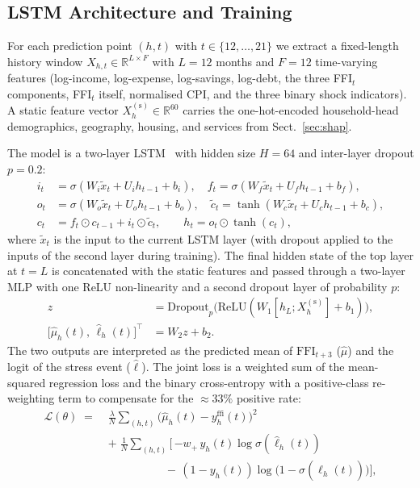 \documentclass[colorlinks,balance]{asmeconf}
\begin{document}
\subsection{LSTM Architecture and Training}\label{sec:ew:lstm}
For each prediction point $(h, t)$ with $t \!\in\! \{12, \ldots, 21\}$ we extract a fixed-length history window $X_{h,t} \!\in\! \mathbb{R}^{L \times F}$ with $L \!=\! 12$ months and $F \!=\! 12$ time-varying features (log-income, log-expense, log-savings, log-debt, the three FFI$_t$ components, FFI$_t$ itself, normalised CPI, and the three binary shock indicators). A static feature vector $X^{(\mathrm{s})}_h \!\in\! \mathbb{R}^{60}$ carries the one-hot-encoded household-head demographics, geography, housing, and services from Sect.~\ref{sec:shap}.

The model is a two-layer LSTM~\cite{hochreiter1997lstm} with hidden size $H \!=\! 64$ and inter-layer dropout $p \!=\! 0.2$:
\begin{align}
i_t &= \sigma(W_i \tilde x_t + U_i h_{t\!-\!1} + b_i),\quad
f_t  = \sigma(W_f \tilde x_t + U_f h_{t\!-\!1} + b_f), \nonumber\\
o_t &= \sigma(W_o \tilde x_t + U_o h_{t\!-\!1} + b_o),\quad
\tilde c_t = \tanh(W_c \tilde x_t + U_c h_{t\!-\!1} + b_c), \nonumber\\
c_t &= f_t \odot c_{t\!-\!1} + i_t \odot \tilde c_t,\qquad
h_t  = o_t \odot \tanh(c_t), \label{eq:lstm}
\end{align}
where $\tilde x_t$ is the input to the current LSTM layer (with dropout applied to the inputs of the second layer during training). The final hidden state of the top layer at $t \!=\! L$ is concatenated with the static features and passed through a two-layer MLP with one ReLU non-linearity and a second dropout layer of probability $p$:
\begin{align}\label{eq:head}
z &= \mathrm{Dropout}_p\!\big(\mathrm{ReLU}(W_1 [h_L; X^{(\mathrm{s})}_h] + b_1)\big), \nonumber\\
\big[\hat\mu_h(t),\, \hat\ell_h(t)\big]^\top &= W_2 z + b_2.
\end{align}
The two outputs are interpreted as the predicted mean of $\mathrm{FFI}_{t\!+\!3}$ ($\hat\mu$) and the logit of the stress event ($\hat\ell$). The joint loss is a weighted sum of the mean-squared regression loss and the binary cross-entropy with a positive-class re-weighting term to compensate for the $\approx 33\%$ positive rate:
\begin{equation}\label{eq:loss}
\begin{aligned}
\mathcal{L}(\theta) \;=\;& \frac{\lambda}{N}\sum_{(h,t)}\!\big(\hat\mu_h(t) - y^{\text{ffi}}_h(t)\big)^2 \\
                       & +\; \frac{1}{N}\sum_{(h,t)}\!\Big[\,{-w_+}\, y_h(t)\log\sigma(\hat\ell_h(t))  \\
                       & \qquad\qquad\quad -\, (1-y_h(t))\log\big(1-\sigma(\hat\ell_h(t))\big)\Big],
\end{aligned}
\end{equation}
\end{document}
